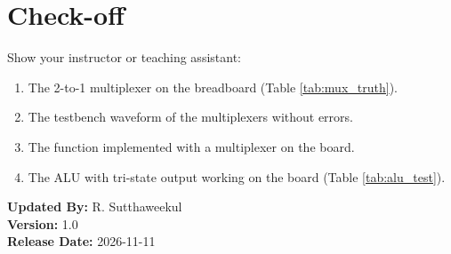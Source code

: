 \documentclass{article}
\begin{document}
\section*{Check-off}
Show your instructor or teaching assistant:
\begin{enumerate}
    \item The 2-to-1 multiplexer on the breadboard (Table \ref{tab:mux_truth}).
    \item The testbench waveform of the multiplexers without errors.
    \item The function implemented with a multiplexer on the board.
    \item The ALU with tri-state output working on the board (Table \ref{tab:alu_test}).
\end{enumerate}

\vspace{1cm}
\noindent \textbf{Updated By:} R. Sutthaweekul \\
\textbf{Version:} 1.0 \\
\textbf{Release Date:} 2026-11-11
\end{document}
